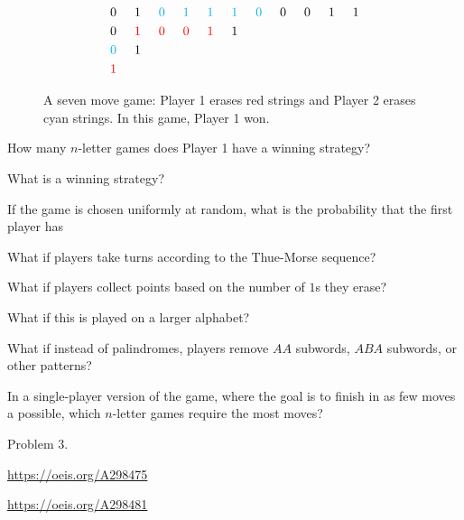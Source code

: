 \documentclass{article}
\begin{document}
\begin{figure}[ht!]
\begin{align*}
    &0 \hspace{5mm} 1 \hspace{5mm} {\color{cyan} 0 \hspace{5mm} 1 \hspace{5mm} 1 \hspace{5mm} 1 \hspace{5mm} 0} \hspace{5mm} 0 \hspace{5mm} 0 \hspace{5mm} 1 \hspace{5mm} 1 \\
    &0 \hspace{5mm} {\color{red} 1 \hspace{5mm} 0 \hspace{5mm} 0 \hspace{5mm} 1} \hspace{5mm} 1 \\
    &{\color{cyan} 0} \hspace{5mm} 1 \\
    &{\color{red} 1}
  \end{align*}
  \caption{
    A seven move game: Player 1 erases red strings
    and Player 2 erases cyan strings. In this game, Player 1 won.
  }
\end{figure}

\begin{question}
  How many $n$-letter games does Player 1 have a winning strategy?
\end{question}

\begin{related}
  \item What is a winning strategy?
  \item If the game is chosen uniformly at random, what is the probability that
    the first player has
  \item What if players take turns according to the Thue-Morse sequence?
  \item What if players collect points based on the number of $1$s they erase?
  \item What if this is played on a larger alphabet?
  \item What if instead of palindromes, players remove $AA$ subwords,
    $ABA$ subwords, or other patterns?
  \item In a single-player version of the game, where the goal is to finish in
    as few moves a possible, which $n$-letter games require the most moves?
\end{related}

\begin{references}
  \item Problem 3.
  \item \url{https://oeis.org/A298475}
  \item \url{https://oeis.org/A298481}
\end{references}
\end{document}
